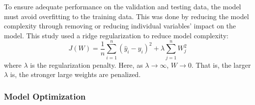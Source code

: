 To ensure adequate performance on the validation and testing data, the model must avoid overfitting to the training data.  This was done by reducing the model complexity through removing or reducing individual variables' impact on the model.  This study used a ridge regularization to reduce model complexity:
\begin{equation}
    J(W) = \frac{1}{n}\sum\limits^n_{i=1}(\hat{y}_i - y_i)^2 + \lambda \sum\limits^n_{j=1} W_j^2
    \label{eq:08MSE_wR}
\end{equation}
where $\lambda$ is the regularization penalty.  Here, as $\lambda \rightarrow \infty$, $W \rightarrow 0$.  That is, the larger $\lambda$ is, the stronger large weights are penalized. 

\subsubsection{Model Optimization}

